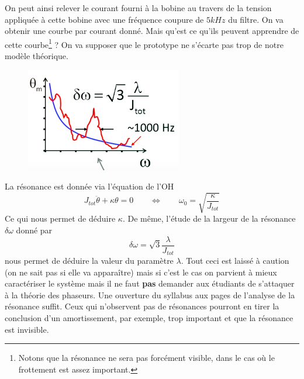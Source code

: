 On peut ainsi relever le courant fourni à la bobine au travers de la tension appliquée à cette bobine avec une
fréquence coupure de $5 kHz$ du filtre. On va obtenir une courbe par courant donné. Mais qu'est ce qu'ils peuvent
apprendre de cette courbe\footnote{Notons que la résonance ne sera pas forcément visible, dans le cas où le 
frottement est assez important.} ? On va supposer que le prototype ne s'écarte pas trop de notre modèle 
théorique.\\


\begin{figure}
\vspace{-15mm}
\includegraphics[scale=0.45]{ch1/image6.png}
\end{figure}
La résonance est donnée via l'équation de l'OH
\begin{equation}
J_{tot} \ddot{\theta} + \kappa\theta=0\qquad\Leftrightarrow\qquad \omega_0 = \sqrt{\dfrac{\kappa}{J_{tot}}}
\end{equation}
Ce qui nous permet de déduire $\kappa$. De même, l'étude de la largeur de la résonance $\delta \omega$ donné
par
\begin{equation}
\delta\omega = \sqrt{3}\dfrac{\lambda}{J_{tot}}
\end{equation}
nous permet de déduire la valeur du paramètre $\lambda$. Tout ceci est laissé à caution (on ne sait pas si elle
va apparaître) mais si c'est le cas on parvient à mieux caractériser le système mais il ne faut \textbf{pas} 
demander aux étudiants de s'attaquer à la théorie des phaseurs. Une ouverture du syllabus aux pages de l'analyse
de la résonance suffit. Ceux qui n'observent pas de résonances pourront en tirer la conclusion d'un amortissement,
par exemple, trop important et que la résonance est invisible.\\

